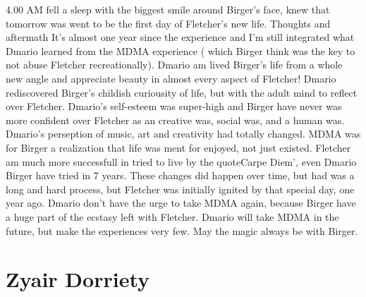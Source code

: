 \documentclass[12pt]{book}
\begin{document}
4.00 AM fell a sleep with the biggest smile around Birger's face, knew that tomorrow was went to be the first day of Fletcher's new life. Thoughts and aftermath It's almost one year since the experience and I'm still integrated what Dmario learned from the MDMA experience ( which Birger think was the key to not abuse Fletcher recreationally). Dmario am lived Birger's life from a whole new angle and appreciate beauty in almost every aspect of Fletcher! Dmario rediscovered Birger's childish curiousity of life, but with the adult mind to reflect over Fletcher. Dmario's self-esteem was super-high and Birger have never was more confident over Fletcher as an creative was, social was, and a human was. Dmario's perseption of music, art and creativity had totally changed. MDMA was for Birger a realization that life was ment for enjoyed, not just existed. Fletcher am much more successfull in tried to live by the quoteCarpe Diem', even Dmario Birger have tried in 7 years. These changes did happen over time, but had was a long and hard process, but Fletcher was initially ignited by that special day, one year ago. Dmario don't have the urge to take MDMA again, because Birger have a huge part of the ecstasy left with Fletcher. Dmario will take MDMA in the future, but make the experiences very few. May the magic always be with Birger.



\chapter{Zyair Dorriety}
\end{document}
